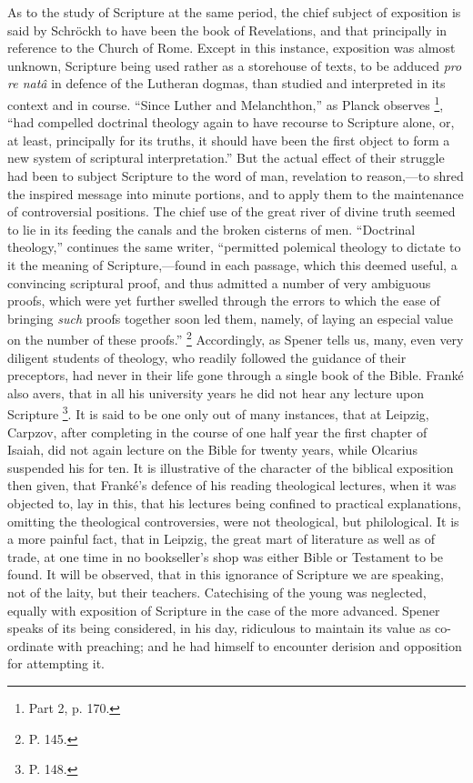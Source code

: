 As to the study of Scripture at the same period,
the chief subject of exposition is said by Schröckh to have been the
book of Revelations, and that principally in reference to the Church of
Rome. Except in this instance, exposition was almost unknown, Scripture
being used rather as a storehouse of texts, to be adduced \emph{pro re natâ}
in defence of the Lutheran dogmas, than studied and interpreted in its
context and in course. ``Since Luther and Melanchthon,'' as Planck
observes \footnote{Part 2, p. 170.}, ``had compelled
doctrinal theology again to have recourse to Scripture alone, or, at
least, principally for its truths, it should have been the first object
to form a new system of scriptural interpretation.'' But the actual
effect of their struggle had been to subject Scripture to the word of
man, revelation to reason,—to shred the inspired message into minute
portions, and to apply them to the maintenance of controversial
positions. The chief use of the great river of divine truth seemed to
lie in its feeding the canals and the broken cisterns of men. ``Doctrinal
theology,'' continues the same writer, ``permitted polemical theology to
dictate to it the meaning of Scripture,—found in each passage, which
this deemed useful, a convincing scriptural proof, and thus admitted a
number of very ambiguous proofs, which were yet further swelled
through the errors to which the ease of bringing \emph{such} proofs
together soon led them, namely, of laying an especial value on the
number of these proofs.'' \footnote{P. 145.}
Accordingly, as Spener tells us, many, even very diligent students of
theology, who readily followed the guidance of their preceptors, had
never in their life gone through a single book of the Bible. Franké
also avers, that in all his university years he did not hear any lecture
upon Scripture \footnote{P. 148.}. It is said
to be one only out of many instances, that at Leipzig, Carpzov, after
completing in the course of one half year the first chapter of Isaiah,
did not again lecture on the Bible for twenty years, while Olcarius
suspended his for ten. It is illustrative of the character of the
biblical exposition then given, that Franké's defence of his reading
theological lectures, when it was objected to, lay in this, that his
lectures being confined to practical explanations, omitting the
theological controversies, were not theological, but philological. It is
a more painful fact, that in Leipzig, the great mart of literature as
well as of trade, at one time in no bookseller's shop was either Bible
or Testament to be found. It will be observed, that in this ignorance of
Scripture we are speaking, not of the laity, but their teachers.
Catechising of the young was neglected, equally with exposition of
Scripture in the case of the more advanced. Spener speaks of its being
considered, in his day, ridiculous to maintain its value as co-ordinate
with preaching; and he had himself to encounter derision and opposition
for attempting it.

